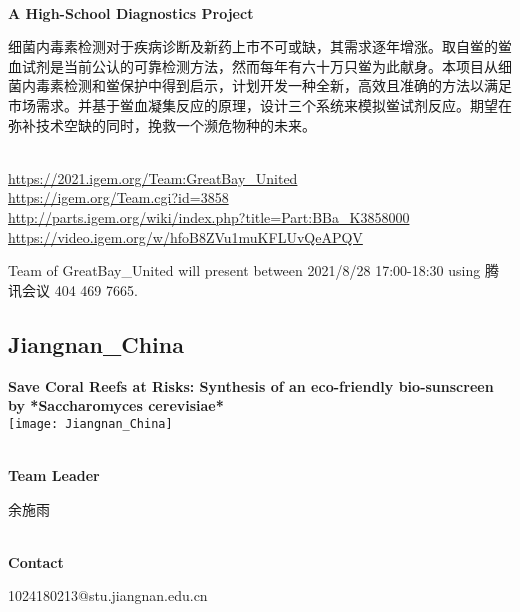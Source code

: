 \textbf{\\A High-School Diagnostics Project\\}\begin{spacing}{1.5}

细菌内毒素检测对于疾病诊断及新药上市不可或缺，其需求逐年增涨。取自鲎的鲎血试剂是当前公认的可靠检测方法，然而每年有六十万只鲎为此献身。本项目从细菌内毒素检测和鲎保护中得到启示，计划开发一种全新，高效且准确的方法以满足市场需求。并基于鲎血凝集反应的原理，设计三个系统来模拟鲎试剂反应。期望在弥补技术空缺的同时，挽救一个濒危物种的未来。\end{spacing}
\\

\url{https://2021.igem.org/Team:GreatBay\_United }\\
\url{https://igem.org/Team.cgi?id=3858 }\\
\url{http://parts.igem.org/wiki/index.php?title=Part:BBa_K3858000 }\\
\url{https://video.igem.org/w/hfoB8ZVu1muKFLUvQeAPQV }\\

\vfill{}









Team of GreatBay\_United will present between        2021/8/28 17:00-18:30 using 腾讯会议 404 469 7665.
\newpage


\subsection{\textcolor{Blu}{ Jiangnan\_China } }
\vspace{5mm}
\begin{center}
\large{
  \textbf{ Save Coral Reefs at Risks: Synthesis of an eco-friendly bio-sunscreen by *Saccharomyces cerevisiae* }\\
  \texttt{[image: Jiangnan\_China]}
}
\end{center}
\textbf{\\Team Leader}

  余施雨


\textbf{\\Contact}

  1024180213@stu.jiangnan.edu.cn


